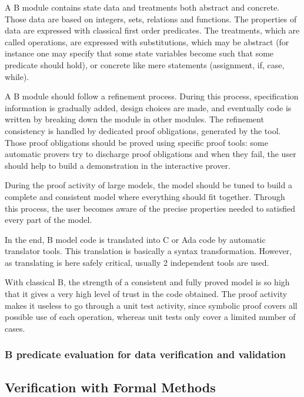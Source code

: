 \documentclass{template/openetcs_report}
\begin{document}
A B module contains state data and treatments both abstract and concrete. Those data are based on integers, sets, relations and functions. The properties of data are expressed with classical first order predicates. The treatments, which are called operations, are expressed with substitutions, which may be abstract (for instance one may specify that some state variables become such that some predicate should hold), or concrete like mere statements (assignment, if, case, while). 

A B module should follow a refinement process. During this process, specification information is gradually added, design choices are made, and eventually code is written by breaking down the module in other modules. The refinement consistency is handled by dedicated proof obligations, generated by the tool. Those proof obligations should be proved using specific proof tools: some automatic provers try to discharge proof obligations and when they fail, the user should help to build a demonstration in the interactive prover.

During the proof activity of large models, the model should be tuned to build a complete and consistent model where everything should fit together. Through this process, the user becomes aware of the precise properties needed to satisfied every part of the model.

In the end, B model code is translated into C or Ada code by automatic translator tools. This translation is basically a syntax transformation. However, as translating is here safely critical, usually 2 independent tools are used.

With classical B, the strength of a consistent and fully proved model is so high that it gives a very  high level of trust in the code obtained. The proof activity makes it useless to go through a unit test activity, since symbolic proof covers all possible use of each operation, whereas unit tests only cover a limited number of cases.

\subsubsection{B predicate evaluation for data verification and validation}

\subsection{Verification with Formal Methods}
\end{document}
